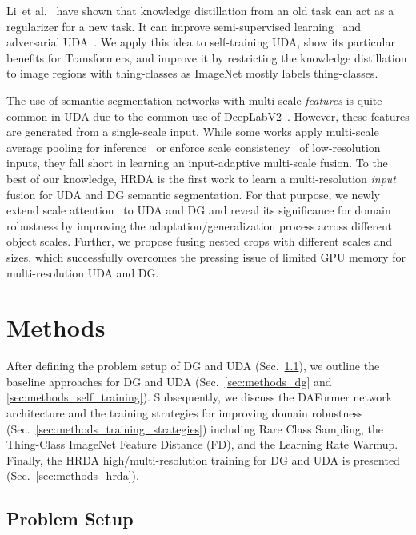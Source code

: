 \documentclass[journal,compsoc]{IEEEtran}
\begin{document}
Li~et al.~\cite{li2017learning} have shown that knowledge distillation from an old task can act as a regularizer for a new task. It can improve semi-supervised learning~\cite{hoyer2021three} and adversarial UDA~\cite{chen2018road}. We apply this idea to self-training UDA, show its particular benefits for Transformers, and improve it by restricting the knowledge distillation to image regions with thing-classes as ImageNet mostly labels thing-classes.

The use of semantic segmentation networks with multi-scale \emph{features} is quite common in UDA due to the common use of DeepLabV2~\cite{chen2017deeplab}. However, these features are generated from a single-scale input.
While some works apply multi-scale average pooling for inference~\cite{araslanov2021self, wang2020classes} or enforce scale consistency~\cite{subhani2020learning,iqbal2020mlsl} of low-resolution inputs, they fall short in learning an input-adaptive multi-scale fusion.
To the best of our knowledge, HRDA is the first work to learn a multi-resolution \emph{input} fusion for UDA and DG semantic segmentation.
For that purpose, we newly extend scale attention~\cite{chen2016attention,tao2020hierarchical} to UDA and DG and reveal its significance for domain robustness by improving the adaptation/generalization process across different object scales.
Further, we propose fusing nested crops with different scales and sizes, which successfully overcomes the pressing issue of limited GPU memory for multi-resolution UDA and DG. 

\section{Methods}
\label{sec:methods}

After defining the problem setup of DG and UDA (Sec.~\ref{sec:methods_problem_setup}), we outline the baseline approaches for DG and UDA (Sec.~\ref{sec:methods_dg} and \ref{sec:methods_self_training}). Subsequently, we discuss the DAFormer network architecture and the training strategies for improving domain robustness (Sec.~\ref{sec:methods_training_strategies}) including Rare Class Sampling, the Thing-Class ImageNet Feature Distance (FD), and the Learning Rate Warmup. Finally, the HRDA high/multi-resolution training for DG and UDA is presented (Sec.~\ref{sec:methods_hrda}).

\subsection{Problem Setup}
\label{sec:methods_problem_setup}
\end{document}
